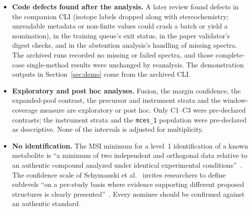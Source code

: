 \documentclass[11pt]{article}
\newcommand{\m}[1]{\texttt{#1}}
\begin{document}
\begin{itemize}
from the target during normalisation and are superseded here. Corrected fusion removes the target before normalisation
and recalibrates on validation. This remains an artificial target-removal stress test, not a deployment guarantee.
The cached-score correction does not test different training seeds or rebuild the candidate pools.
\item \textbf{Code defects found after the analysis.} A later review found defects in the companion CLI (isotope labels
dropped along with stereochemistry; unreadable metadata or non-finite values could crash a batch or yield a nomination),
in the training queue's exit status, in the paper validator's digest checks, and in the abstention analysis's handling of
missing spectra. The archived runs recorded no missing or failed spectra, and those complete-case single-method results were unchanged by reanalysis. The demonstration outputs in Section~\ref{sec:demo} come from the archived CLI.
\item \textbf{Exploratory and post hoc analyses.} Fusion, the margin confidence, the expanded-pool contrast, the precursor and
instrument strata and the window-coverage measure are exploratory or post hoc. Only C1--C3 were pre-declared contrasts; the instrument
strata and the \m{mces\_1} population were pre-declared as descriptive. None of the intervals is adjusted for multiplicity.
\item \textbf{No identification.} The MSI minimum for a level~1 identification of a known metabolite is ``a minimum of two
independent and orthogonal data relative to an authentic compound analyzed under identical experimental
conditions''~\citep{sumner2007msi}. The confidence scale of Schymanski et al.~\citep{schymanski2014} invites researchers to
define sublevels ``on a per-study basis where evidence supporting different proposed structures is clearly
presented''~\citep{charbonnet2022}. Every nominee should be confirmed against an authentic standard.
\end{itemize}

\end{document}
